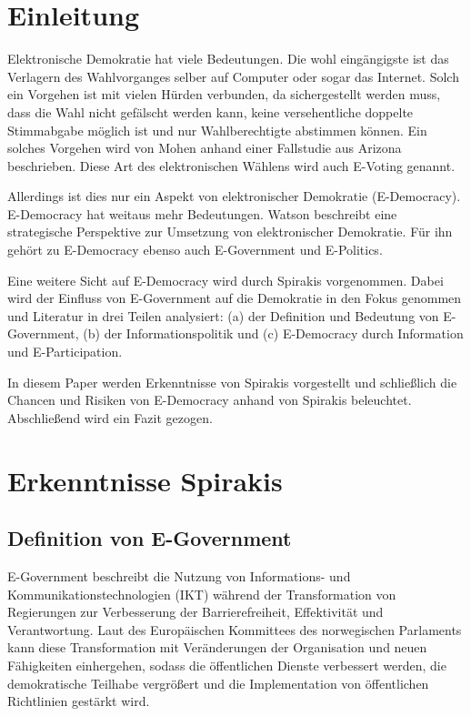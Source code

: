 \documentclass[12pt,twoside,ngerman]{scrartcl}
\theoremstyle{plain}
\theoremstyle{definition}
\theoremstyle{remark}
\begin{document}
\section{Einleitung}
\label{sec:introduction}

	Elektronische Demokratie hat viele Bedeutungen. Die wohl eingängigste ist das Verlagern des Wahlvorganges selber auf Computer oder sogar das Internet.\cite{Mohen2001} Solch ein Vorgehen ist mit vielen Hürden verbunden, da sichergestellt werden muss, dass die Wahl nicht gefälscht werden kann, keine versehentliche doppelte Stimmabgabe möglich ist und nur Wahlberechtigte abstimmen können. Ein solches Vorgehen wird von Mohen\cite{Mohen2001} anhand einer Fallstudie aus Arizona beschrieben. Diese Art des elektronischen Wählens wird auch E-Voting genannt.\cite{Spirakis2010}
	
	Allerdings ist dies nur ein Aspekt von elektronischer Demokratie (E-Democracy). E-Democracy hat weitaus mehr Bedeutungen. Watson\cite{Watson2001} beschreibt eine strategische Perspektive zur Umsetzung von elektronischer Demokratie. Für ihn gehört zu E-Democracy ebenso auch E-Government und E-Politics.
	
	Eine weitere Sicht auf E-Democracy wird durch Spirakis\cite{Spirakis2010} vorgenommen. Dabei wird der Einfluss von E-Government auf die Demokratie in den Fokus genommen und Literatur in drei Teilen analysiert: (a) der Definition und Bedeutung von E-Government, (b) der Informationspolitik und (c) E-Democracy durch Information und E-Participation.
	
	In diesem Paper werden Erkenntnisse von Spirakis vorgestellt und schließlich die Chancen und Risiken von E-Democracy anhand von Spirakis beleuchtet. Abschließend wird ein Fazit gezogen.
	
\section{Erkenntnisse Spirakis}
\label{sec:erkenntnisseSpirakis}

\subsection*{Definition von E-Government}
	E-Government beschreibt die Nutzung von Informations- und Kommunikationstechnologien (IKT) während der Transformation von Regierungen zur Verbesserung der Barrierefreiheit, Effektivität und Verantwortung. Laut des Europäischen Kommittees des norwegischen Parlaments kann diese Transformation mit Veränderungen der Organisation und neuen Fähigkeiten einhergehen, sodass die öffentlichen Dienste verbessert werden, die demokratische Teilhabe vergrößert und die Implementation von öffentlichen Richtlinien gestärkt wird.\cite{Spirakis2010} 
	
\end{document}
